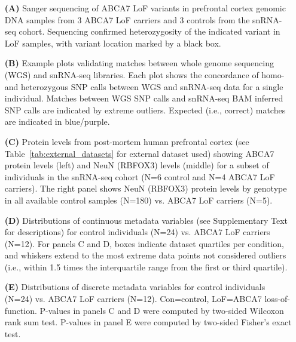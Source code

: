 \begin{itemize}
    \item[\textbf{(A)}] Sanger sequencing of ABCA7 LoF variants in prefrontal cortex genomic DNA samples from 3 ABCA7 LoF carriers and 3 controls from the snRNA-seq cohort. Sequencing confirmed heterozygosity of the indicated variant in LoF samples, with variant location marked by a black box. 
    \item[\textbf{(B)}] Example plots validating matches between whole genome sequencing (WGS) and snRNA-seq libraries. Each plot shows the concordance of homo- and heterozygous SNP calls between WGS and snRNA-seq data for a single individual. Matches between WGS SNP calls and snRNA-seq BAM inferred SNP calls are indicated by extreme outliers. Expected (i.e., correct) matches are indicated in blue/purple. 
    \item[\textbf{(C)}] Protein levels from post-mortem human prefrontal cortex (see Table~\ref{tab:external_datasets} for external dataset used) showing ABCA7 protein levels (left) and NeuN (RBFOX3) levels (middle) for a subset of individuals in the snRNA-seq cohort (N=6 control and N=4 ABCA7 LoF carriers). The right panel shows NeuN (RBFOX3) protein levels by genotype in all available control samples (N=180) vs. ABCA7 LoF carriers (N=5). 
    \item[\textbf{(D)}] Distributions of continuous metadata variables (see Supplementary Text for descriptions) for control individuals (N=24) vs. ABCA7 LoF carriers (N=12). For panels C and D, boxes indicate dataset quartiles per condition, and whiskers extend to the most extreme data points not considered outliers (i.e., within 1.5 times the interquartile range from the first or third quartile). 
    \item[\textbf{(E)}] Distributions of discrete metadata variables for control individuals (N=24) vs. ABCA7 LoF carriers (N=12). Con=control, LoF=ABCA7 loss-of-function. P-values in panels C and D were computed by two-sided Wilcoxon rank sum test. P-values in panel E were computed by two-sided Fisher’s exact test.
\end{itemize}
